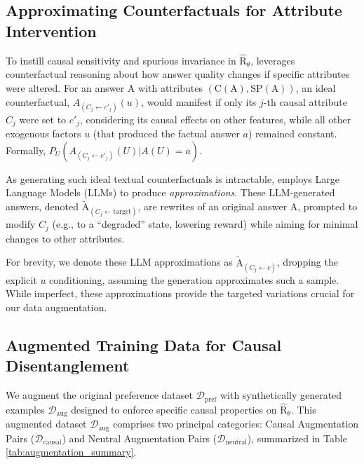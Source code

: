 \vspace{-0.15in}
\subsection{Approximating Counterfactuals for Attribute Intervention}
\label{subsec:approximating_counterfactuals}
\vspace{-0.1in}

To instill causal sensitivity and spurious invariance in $\hat{\mathrm{R}}_\theta$, \carma{} leverages counterfactual reasoning about how answer quality changes if specific attributes were altered. For an answer $\mathrm{A}$ with attributes $(\mathrm{C}(\mathrm{A}), \mathrm{SP}(\mathrm{A}))$, an ideal counterfactual, $A_{(C_j \leftarrow c'_j)}(u)$, would manifest if only its $j$-th causal attribute $C_j$ were set to $c'_j$, considering its causal effects on other features, while all other exogenous factors $u$ (that produced the factual answer $a$) remained constant. Formally, $P_{U}(A_{(C_j \leftarrow c'_j)}(U) | A(U)=a)$.

\vspace{-0.05in}
As generating such ideal textual counterfactuals is intractable, \carma{} employs Large Language Models (LLMs) to produce \textit{approximations}. These LLM-generated answers, denoted $\tilde{\mathrm{A}}_{(C_j \leftarrow \text{target})}$, are rewrites of an original answer $\mathrm{A}$, prompted to modify $C_j$ (e.g., to a ``degraded'' state, lowering reward) while aiming for minimal changes to other attributes.


\begin{remark}
For brevity, we denote these LLM approximations as $\tilde{\mathrm{A}}_{(C_j \leftarrow c)}$, dropping the explicit $u$ conditioning, assuming the generation approximates such a sample. While imperfect, these approximations provide the targeted variations crucial for our data augmentation.
\end{remark}


\vspace{-0.15in}
\subsection{Augmented Training Data for Causal Disentanglement}
\label{subsec:data_augmentation}


\vspace{-0.1in}
We augment the original preference dataset $\mathcal{D}_{\mathrm{pref}}$ with synthetically generated examples $\mathcal{D}_{\mathrm{aug}}$ designed to enforce specific causal properties on $\hat{\mathrm{R}}_\theta$. This augmented dataset $\mathcal{D}_{\mathrm{aug}}$ comprises two principal categories: Causal Augmentation Pairs ($\mathcal{D}_{\mathrm{causal}}$) and Neutral Augmentation Pairs ($\mathcal{D}_{\mathrm{neutral}}$), summarized in Table \ref{tab:augmentation_summary}.


